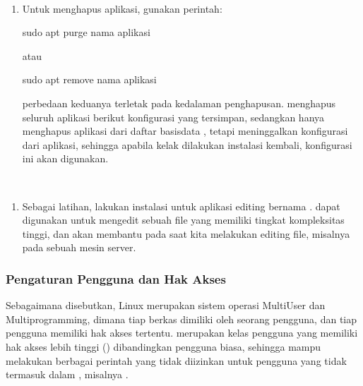 \documentclass[letterpaper,10pt,english]{sphinxmanual}
\begin{document}
 
\begin{enumerate}
%
\item {} 
Untuk menghapus aplikasi, gunakan perintah:

\begin{sphinxVerbatim}[commandchars=\\\{\}]
sudo apt purge \PYGZlt{}nama aplikasi\PYGZgt{}
\end{sphinxVerbatim}

atau

\begin{sphinxVerbatim}[commandchars=\\\{\}]
sudo apt remove \PYGZlt{}nama aplikasi\PYGZgt{}
\end{sphinxVerbatim}

perbedaan keduanya terletak pada kedalaman penghapusan.  menghapus seluruh aplikasi berikut konfigurasi yang tersimpan, sedangkan  hanya menghapus aplikasi dari daftar basisdata , tetapi meninggalkan konfigurasi dari aplikasi, sehingga apabila kelak dilakukan instalasi kembali, konfigurasi ini akan digunakan.

\end{enumerate}

 
\begin{enumerate}
%
\item {} 
Sebagai latihan, lakukan instalasi untuk aplikasi editing bernama .  dapat digunakan untuk mengedit sebuah file yang memiliki tingkat kompleksitas tinggi, dan akan membantu pada saat kita melakukan editing file, misalnya pada sebuah mesin server.

\end{enumerate}


\subsubsection{Pengaturan Pengguna dan Hak Akses}
\label{\detokenize{sesi1/arsitektur:pengaturan-pengguna-dan-hak-akses}}
Sebagaimana disebutkan, Linux merupakan sistem operasi MultiUser dan Multiprogramming, dimana tiap berkas dimiliki oleh seorang pengguna, dan tiap pengguna memiliki hak akses tertentu.  merupakan kelas pengguna yang memiliki hak akses lebih tinggi () dibandingkan pengguna biasa, sehingga mampu melakukan berbagai perintah yang tidak diizinkan untuk pengguna yang tidak termasuk dalam , misalnya .
\end{document}

